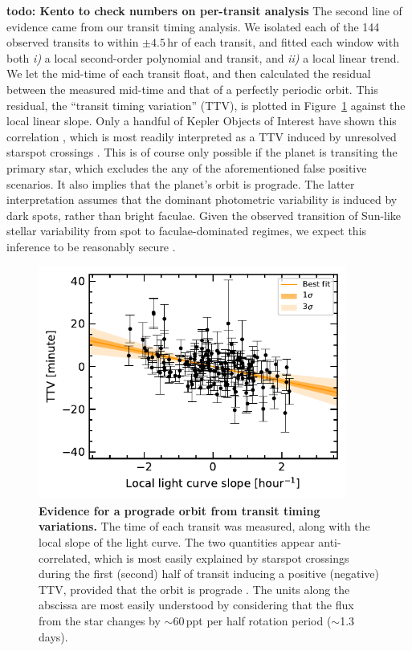 \documentclass[12pt,modern,tighten]{aastex63}
\begin{document}
{\bf todo: Kento to check numbers on per-transit analysis} 
The second line of evidence came from our transit timing analysis. We
isolated each of the 144 observed transits to within $\pm4.5$\,hr of
each transit, and fitted each window with both {\it i)} a local
second-order polynomial and transit, and {\it ii)} a local linear
trend.  We let the mid-time of each transit float, and then calculated
the residual between the measured mid-time and that of a perfectly
periodic orbit.  This residual, the ``transit timing variation''
(TTV), is plotted in Figure~\ref{fig:ttvslope} against the local
linear slope.  Only a handful of Kepler Objects of Interest have shown
this correlation \citep{holczer_time_2015}, which is most readily
interpreted as a TTV induced by unresolved starspot crossings
\citep{mazeh_time_2015}.  This is of course only possible if the
planet is transiting the primary star, which excludes the any of the
aforementioned false positive scenarios.  It also implies that the
planet's orbit is prograde.  The latter interpretation assumes that
the dominant photometric variability is induced by dark spots, rather
than bright faculae.  Given the observed transition of Sun-like
stellar variability from spot to faculae-dominated regimes, we expect
this inference to be reasonably secure
\citep{shapiro_are_2016,montet_long-term_2017,reinhold_stellar_2020}.

\begin{figure}[tp]
	\begin{center}
		\leavevmode
		\includegraphics[width=0.9\textwidth]{f11.pdf}
	\end{center}
	\vspace{-0.7cm}
	\caption{
		{\bf Evidence for a prograde orbit from transit timing variations.}
    The time of each transit was measured, along with the local slope
    of the light curve.  The two quantities appear anti-correlated,
    which is most easily explained by starspot crossings during the
    first (second) half of transit inducing a positive (negative) TTV,
    provided that the orbit is prograde \citep{mazeh_time_2015}.  The
    units along the abscissa are most easily understood by considering
    that the flux from the star changes by $\sim$60\,ppt per half
    rotation period ($\sim$1.3\,days).
		\label{fig:ttvslope}
	}
\end{figure}
\end{document}
